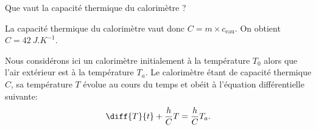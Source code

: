 
\begin{enonce}
	Que vaut la capacité thermique du calorimètre ?
\end{enonce}


\begin{corrige}
	La capacité thermique du calorimètre vaut donc $C=m\times c_{\text{eau}}$.
	On obtient $C=\SI{42 }{J.K^{-1}}$.
\end{corrige}





\finEntrainement


\hauteurLargeurCadreReponse		{8mm}{3cm}
\initialisationEntrainement

\debutEntrainement
Nous considérons ici un calorimètre initialement à la température $T_0$ alors que l'air extérieur est à la température $T_a$.\newline
Le calorimètre étant de capacité thermique $C$, sa température $T$ évolue au cours du temps et obéit à l'équation différentielle suivante:
\[
\diff{T}{t}+\frac{h}{C}T=\frac{h}{C}T_a.
\]


